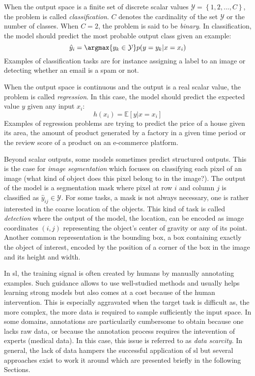 When the output space is a finite set of discrete scalar values $\mathcal{Y} = \left\{1, 2, ..., C\right\}$, the problem is called \textit{classification}. $C$ denotes the cardinality of the set $\mathcal{Y}$ or the number of classes. When $C = 2$, the problem is said to be \textit{binary}. In classification, the model should predict the most probable output class given an example:
\begin{equation}
\hat{y}_i = \argmax{y_k \in \mathcal{Y}} p(y=y_k|x=x_i)
\end{equation}
Examples of classification tasks are for instance assigning a label to an image or detecting whether an email is a spam or not. 

When the output space is continuous and the output is a real scalar value, the problem is called \textit{regression}. In this case, the model should predict the expected value $y$ given any input $x_i$:
\begin{equation}
h(x_i) = \mathbb{E}\left[y|x=x_i\right]
\end{equation}
Examples of regression problems are trying to predict the price of a house given its area, the amount of product generated by a factory in a given time period or the review score of a product on an e-commerce platform. 

Beyond scalar outputs, some models sometimes predict structured outputs. This is the case for \textit{image segmentation} which focuses on classifying each pixel of an image (\ie what kind of object does this pixel belong to in the image?). The output of the model is a segmentation mask where pixel at row $i$ and column $j$ is classified as $\hat{y}_{ij} \in \mathcal{Y}$. For some tasks, a mask is not always necessary, one is rather interested in the coarse location of the objects. This kind of task is called \textit{detection} where the output of the model, the location, can be encoded as image coordinates $(i, j)$ representing the object's center of gravity or any of its point. Another common representation is the bounding box, a box containing exactly the object of interest, encoded by the position of a corner of the box in the image and its height and width.

In \acrlong{sl}, the training signal is often created by humans by manually annotating examples. Such guidance allows to use well-studied methods and usually helps learning strong models but also comes at a cost because of the human intervention. This is especially aggravated when the target task is difficult as, the more complex, the more data is required to sample sufficiently the input space. In some domains, annotations are particularily cumbersome to obtain because one lacks raw data, or because the annotation process requires the intevention of experts (\eg medical data). In this case, this issue is referred to as \textit{data scarcity}. In general, the lack of data hampers the successful application of \acrlong{sl} but several approaches exist to work it around which are presented briefly in the following Sections. 

